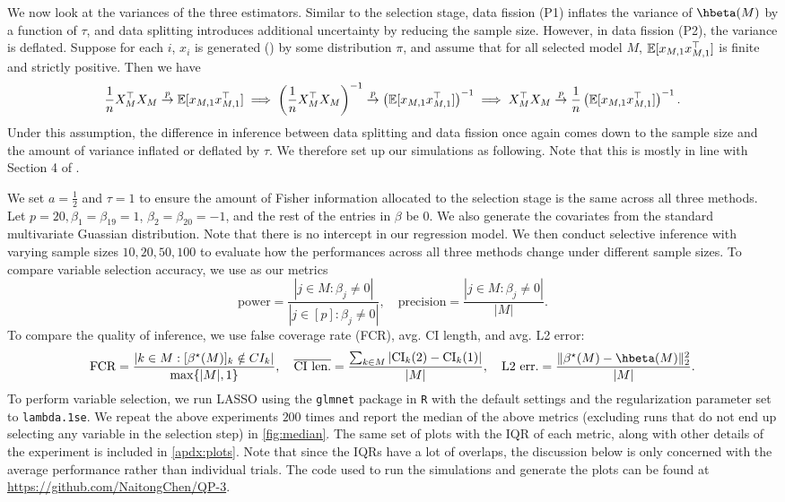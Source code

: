 We now look at the variances of the three estimators. Similar to the selection stage, data fission (P1) inflates the variance of $\hbeta(M)$ by a function of $\tau$, and data splitting introduces additional uncertainty by reducing the sample size. However, in data fission (P2), the variance is deflated. Suppose for each $i$, $x_i$ is generated (\iid) by some distribution $\pi$, and assume that for all selected model $M$, $\mathbb{E}[x_{M,1}x_{M,1}^\top]$ is finite and strictly positive. Then we have
\[
\frac{1}{n}X_M^\top X_M \overset{p}{\to} \mathbb{E}[x_{M,1}x_{M,1}^\top] \implies \left(\frac{1}{n}X_M^\top X_M\right)^{-1} \overset{p}{\to} \left( \mathbb{E}[x_{M,1}x_{M,1}^\top] \right)^{-1} \implies X_M^\top X_M \overset{p}{\to} \frac{1}{n}\left( \mathbb{E}[x_{M,1}x_{M,1}^\top] \right)^{-1}.
\]
Under this assumption, the difference in inference between data splitting and data fission once again comes down to the sample size and the amount of variance inflated or deflated by $\tau$. We therefore set up our simulations as following. Note that this is mostly in line with Section 4 of \cite{leiner2022data}.

We set $a = \frac{1}{2}$ and $\tau=1$ to ensure the amount of Fisher information allocated to the selection stage is the same across all three methods. Let $p=20, \beta_1=\beta_{19}=1$, $\beta_2=\beta_{20}=-1$, and the rest of the entries in $\beta$ be $0$. We also generate the covariates from the standard multivariate Guassian distribution. Note that there is no intercept in our regression model. We then conduct selective inference with varying sample sizes $10, 20, 50, 100$ to evaluate how the performances across all three methods change under different sample sizes. To compare variable selection accuracy, we use as our metrics
\[
\text{power} = \frac{|j\in M: \beta_j \neq 0|}{|j\in [p]: \beta_j \neq 0|}, \quad \text{precision} = \frac{|j\in M: \beta_j \neq 0|}{|M|}.
\]
To compare the quality of inference, we use false coverage rate (FCR), avg. CI length, and avg. L2 error:
\[
\text{FCR} = \frac{|k\in M: [\beta^\star(M)]_k \notin CI_k|}{\max\{|M|, 1\}}, \quad \overline{\text{CI len.}} = \frac{\sum_{k\in M} |\text{CI}_k(2) - \text{CI}_k(1)|}{|M|}, \quad \text{L2 err.} = \frac{\| \beta^\star(M) - \hbeta(M) \|_2^2}{|M|}.
\]
To perform variable selection, we run LASSO using the \texttt{glmnet} package in \texttt{R} with the default settings and the regularization parameter set to \texttt{lambda.1se}. We repeat the above experiments $200$ times and report the median of the above metrics (excluding runs that do not end up selecting any variable in the selection step) in \cref{fig:median}. The same set of plots with the IQR of each metric, along with other details of the experiment is included in \cref{apdx:plots}. Note that since the IQRs have a lot of overlaps, the discussion below is only concerned with the average performance rather than individual trials. The code used to run the simulations and generate the plots can be found at \url{https://github.com/NaitongChen/QP-3}.

